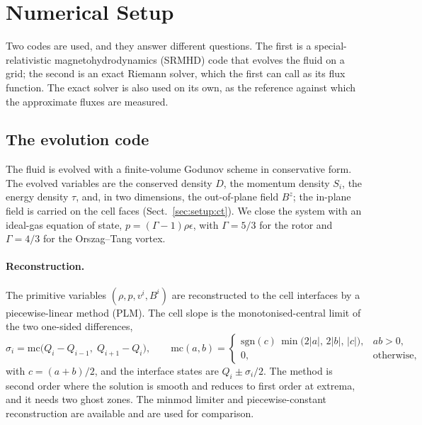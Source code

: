 \section{Numerical Setup}
\label{sec:setup}

Two codes are used, and they answer different questions. The first is a
special-relativistic magnetohydrodynamics (SRMHD) code that evolves the fluid
on a grid; the second is an exact Riemann solver, which the first can call as
its flux function. The exact solver is also used on its own, as the reference
against which the approximate fluxes are measured.

\subsection{The evolution code}
\label{sec:setup:evolution}

The fluid is evolved with a finite-volume Godunov scheme in conservative
form. The evolved variables are the conserved density $D$, the momentum
density $S_i$, the energy density $\tau$, and, in two dimensions, the
out-of-plane field $B^z$; the in-plane field is carried on the cell faces
(Sect.~\ref{sec:setup:ct}). We close the system with an ideal-gas equation of
state, $p = (\Gamma - 1)\rho\epsilon$, with $\Gamma = 5/3$ for the rotor and
$\Gamma = 4/3$ for the Orszag--Tang vortex.

\paragraph{Reconstruction.}
The primitive variables $(\rho, p, v^i, B^i)$ are reconstructed to the cell
interfaces by a piecewise-linear method (PLM). The cell slope is the
monotonised-central limit of the two one-sided differences,
%
\begin{equation}
  \sigma_i = \mathrm{mc}\bigl(Q_i - Q_{i-1},\; Q_{i+1} - Q_i\bigr),
  \qquad
  \mathrm{mc}(a,b) =
  \begin{cases}
    \mathrm{sgn}(c)\,\min\bigl(2\lvert a\rvert,\, 2\lvert b\rvert,\,
                               \lvert c\rvert\bigr), & ab > 0,\\[2pt]
    0, & \text{otherwise},
  \end{cases}
  \label{eq:mc}
\end{equation}
%
with $c = (a+b)/2$, and the interface states are $Q_i \pm \sigma_i/2$. The
method is second order where the solution is smooth and reduces to first order
at extrema, and it needs two ghost zones. The minmod limiter and
piecewise-constant reconstruction are available and are used for comparison.

